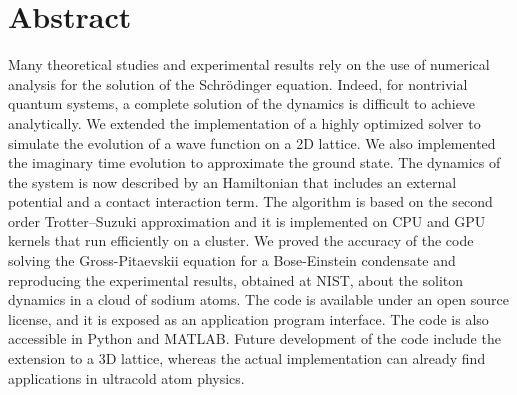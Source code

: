 \chapter*{Abstract}
Many theoretical studies and experimental results rely on the use of numerical analysis for the solution of the Schr\"odinger equation. Indeed, for nontrivial quantum systems, a complete solution of the dynamics is difficult to achieve analytically. We extended the implementation of a highly optimized solver to simulate the evolution of a wave function on a 2D lattice. We also implemented the imaginary time evolution to approximate the ground state. The dynamics of the system is now described by an Hamiltonian that includes an external potential and a contact interaction term. The algorithm is based on the second order Trotter--Suzuki approximation and it is implemented on CPU and GPU kernels that run efficiently on a cluster. We proved the accuracy of the code solving the Gross-Pitaevskii equation for a Bose-Einstein condensate and reproducing the experimental results, obtained at NIST, about the soliton dynamics in a cloud of sodium atoms. The code is available under an open source license, and it is exposed as an application program interface. The code is also accessible in Python and MATLAB. Future development of the code include the extension to a 3D lattice, whereas the actual implementation can already find applications in ultracold atom physics.